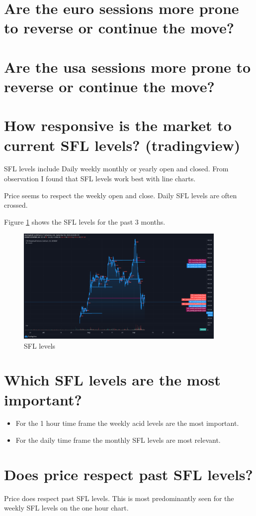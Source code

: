 \section{ Are the euro sessions more prone to reverse or continue the move?}
\section{ Are the usa sessions more prone to reverse or continue the move?}
\section{ How responsive is the market to current SFL levels? (tradingview)}
SFL levels include Daily weekly monthly or yearly open and closed. From observation I found that SFL levels work best with line charts. 

Price seems to respect the weekly open and close. Daily SFL levels are often crossed.

Figure \ref{fig:sfl} shows the SFL levels for the past 3 months.

\begin{figure}[H]
\center
\includegraphics[width=0.9\textwidth]{fig/sfl.png}
\caption{SFL levels}
\label{fig:sfl}
\end{figure}

\section{ Which SFL levels are the most important? }
\begin{itemize}

\item For the 1 hour time frame the weekly acid levels are the most important.
\item For the daily time frame the monthly SFL levels are most relevant.

\end{itemize}

\section{ Does price respect past SFL levels?}
Price does respect past SFL levels.  This is most predominantly seen for the weekly SFL levels on the one hour chart. 